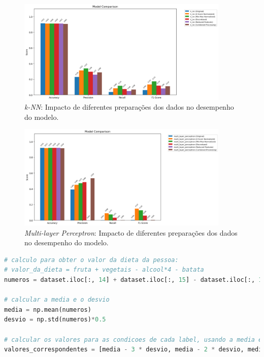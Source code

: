 \begin{figure}[H]
    \centering
    \includegraphics[width=0.9\textwidth]{images/knn_comparison.png}
    \caption{\textit{k-NN}: Impacto de diferentes preparações dos dados no desempenho do modelo.}
    \label{fig:knn_comparison}
\end{figure}

\begin{figure}[H]
    \centering
    \includegraphics[width=0.9\textwidth]{images/mlp_comparison.png}
    \caption{\textit{Multi-layer Perceptron}: Impacto de diferentes preparações dos dados no desempenho do modelo.}
    \label{fig:mlp_comparison}
\end{figure}


\begin{lstlisting}[caption={Excerto de código utilizado para calcular o valor da dieta a partir das categorias de consumo}, language=Python, label={codigo:dieta}]
# calculo para obter o valor da dieta da pessoa:
# valor_da_dieta = fruta + vegetais - alcool*4 - batata
numeros = dataset.iloc[:, 14] + dataset.iloc[:, 15] - dataset.iloc[:, 13]*4 - dataset.iloc[:, 16]

# calcular a media e o desvio
media = np.mean(numeros)
desvio = np.std(numeros)*0.5

# calcular os valores para as condicoes de cada label, usando a media e um desvio
valores_correspondentes = [media - 3 * desvio, media - 2 * desvio, media - desvio, media, media + desvio, media + 2 * desvio, media + 3 * desvio]
\end{lstlisting}

